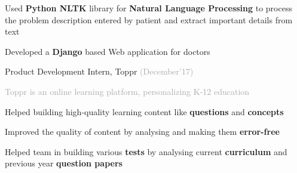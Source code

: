 \begin{cventries}
{\begin{cvitems}
        \vspace{0.3mm}
        \item {Used \textbf{Python NLTK} library for \textbf{Natural Language Processing} to process the problem description entered by patient and extract important details from text}
        \vspace{0.3mm}
        \item {Developed a \textbf{Django} based Web application for doctors}
      \end{cvitems}
    }
  \cventry
    {}
    {Product Development Intern, Toppr}
    {\fontsize{9pt}{1em} \textcolor{darkgray}{(December'17)}}
    {}
    {
      {\fontsize{9.5pt}{1em}\descriptionfont\textcolor{darkgray}{Toppr is an online learning platform, personalizing K-12 education}}
      \vspace{4mm}
      \begin{cvitems}
        \item Helped building high-quality learning content like \textbf{questions} and \textbf{concepts} 
        \item Improved the quality of content by analysing and making them \textbf{error-free}
        \item Helped team in building various \textbf{tests} by analysing current \textbf{curriculum} and previous year \textbf{question papers}
      \end{cvitems}
    }
\end{cventries}
